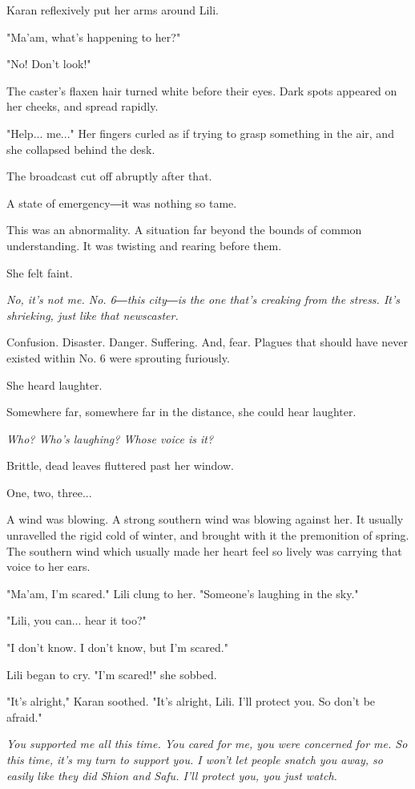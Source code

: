 Karan reflexively put her arms around Lili.

"Ma'am, what's happening to her?"

"No! Don't look!"

The caster's flaxen hair turned white before their eyes. Dark spots
appeared on her cheeks, and spread rapidly.

"Help... me..." Her fingers curled as if trying to grasp something in
the air, and she collapsed behind the desk.

The broadcast cut off abruptly after that.

A state of emergency―it was nothing so tame.

This was an abnormality. A situation far beyond the bounds of common
understanding. It was twisting and rearing before them.

She felt faint.

\emph{No, it's not me. No. 6―this city―is the one that's creaking from the
stress. It's shrieking, just like that newscaster.}

Confusion. Disaster. Danger. Suffering. And, fear. Plagues that should
have never existed within No. 6 were sprouting furiously.

She heard laughter.

Somewhere far, somewhere far in the distance, she could hear laughter.

\emph{Who? Who's laughing? Whose voice is it?}

Brittle, dead leaves fluttered past her window.

One, two, three...

A wind was blowing. A strong southern wind was blowing against her. It
usually unravelled the rigid cold of winter, and brought with it the
premonition of spring. The southern wind which usually made her heart
feel so lively was carrying that voice to her ears.

"Ma'am, I'm scared." Lili clung to her. "Someone's laughing in the sky."

"Lili, you can... hear it too?"

"I don't know. I don't know, but I'm scared."

Lili began to cry. "I'm scared!" she sobbed.

"It's alright," Karan soothed. "It's alright, Lili. I'll protect you. So
don't be afraid."

\emph{You supported me all this time. You cared for me, you were concerned for
me. So this time, it's my turn to support you. I won't let people snatch
you away, so easily like they did Shion and Safu. I'll protect you, you
just watch.}


